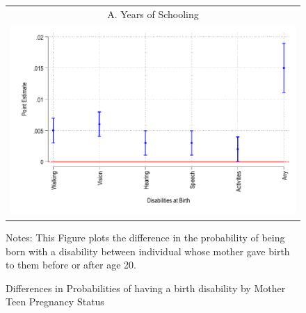 \documentclass[12pt,notitlepage,a4paper]{article}
\begin{document}
\begin{figure}[H]
\captionsetup{justification=centering}
\caption{Differences in Probabilities of having a birth disability by Mother Teen Pregnancy Status}
\begin{centering}
{\begin{tabular}{c}
A. Years of Schooling  \\
\includegraphics[scale=.8]{output/disabilities_coef.pdf}  \\
\end{tabular}\par}
 	 	\vspace{.2cm} %
\begin{spacing}{0.7}
{\footnotesize{}Notes: This Figure plots the difference in the probability of being born with a disability between individual whose mother gave birth to them before or after age 20. 
}{\footnotesize\par}
\end{spacing}
\end{centering}
\end{figure}
\end{document}
